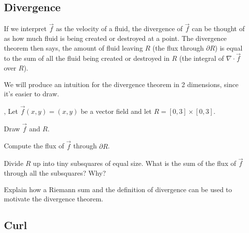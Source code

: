 \documentclass[letter]{article}
\renewcommand{\d}{\mathrm{d}}
\renewcommand{\emph}[1]{{\color{defcolor} \textbf{\textit{##1}}}}
\begin{document}
\subsection*{Divergence}
\vspace{-1cm}


	If we interpret $\vec f$ as the velocity
	of a fluid, the divergence of $\vec f$ can be thought of as how much fluid is being created or destroyed at a point.
	The divergence theorem then says, the amount of fluid leaving $R$ (the flux through $\partial R$) is 
	equal to the sum of all the fluid being created or destroyed in $R$ (the integral of $\nabla \cdot \vec f$
	over $R$).

	We will produce an intuition for the divergence theorem in 2 dimensions, since it's easier to draw.
	
	\sep
	Let $\vec f(x,y)=(x,y)$ be a vector field and let $R=[0,3]\times [0,3]$.
	\begin{Enum}
		\item Draw $\vec f$ and $R$.
		\item Compute the flux of $\vec f$ through $\partial R$.
		\item Divide $R$ up into tiny subsquares of equal size.  What is the sum of
			the flux of $\vec f$ through all the subsquares?  Why?
		\item Explain how a Riemann sum and the definition of divergence can be used
			to motivate the divergence theorem.
	\end{Enum}

	\vspace{-.5cm}
\subsection*{Curl}
\end{document}

